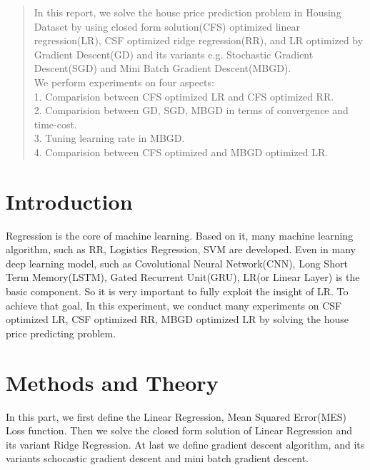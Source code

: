 \documentclass[journal, a4paper]{IEEEtran}
\begin{document}
\begin{abstract}
In this report, we solve the house price prediction problem in Housing Dataset by using closed form solution(CFS) optimized linear regression(LR), CSF optimized ridge regression(RR), and LR optimized by Gradient Descent(GD) and its variants e.g. Stochastic Gradient Descent(SGD) and Mini Batch Gradient Descent(MBGD). \\
We perform experiments on four aspects: \\
1. Comparision between CFS optimized LR and CFS optimized RR. \\
2. Comparision between GD, SGD, MBGD in terms of convergence and time-cost. \\
3. Tuning learning rate in MBGD. \\
4. Comparision between CFS optimized and MBGD optimized LR. \\
\end{abstract}

\section{Introduction}
 Regression is the core of machine learning. Based on it, many machine learning algorithm, such as RR, Logistics Regression, SVM are developed. Even in many deep learning model, such as Covolutional Neural Network(CNN), Long Short Term Memory(LSTM), Gated Recurrent Unit(GRU), LR(or Linear Layer) is the basic component. So it is very important to fully exploit the insight of LR. To achieve that goal, In this experiment, we conduct many experiments on CSF optimized LR, CSF optimized RR, MBGD optimized LR by solving the house price predicting problem.

\section{Methods and Theory}
In this part, we first define the Linear Regression, Mean Squared Error(MES) Loss function. Then we solve the closed form solution of Linear Regression and its variant Ridge Regression. At last we define gradient descent algorithm, and its variants schocastic gradient descent and mini batch gradient descent.
\end{document}
